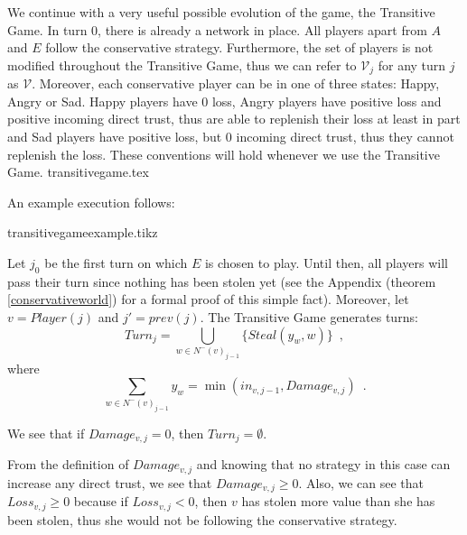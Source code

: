    We continue with a very useful possible evolution of the game, the Transitive Game. In turn 0, there is already a network
   in place. All players apart from $A$ and $E$ follow the conservative strategy. Furthermore, the set of players is not
   modified throughout the Transitive Game, thus we can refer to $\mathcal{V}_j$ for any turn $j$ as $\mathcal{V}$.
   Moreover, each conservative player can be in one of three states: Happy, Angry or Sad. Happy players have 0 loss, Angry
   players have positive loss and positive incoming direct trust, thus are able to replenish their loss at least in part and
   Sad players have positive loss, but 0 incoming direct trust, thus they cannot replenish the loss. These conventions will
   hold whenever we use the Transitive Game.
   {transitivegame.tex}

   An example execution follows:

   {transitivegameexample.tikz}

   Let $j_0$ be the first turn on which $E$ is chosen to play. Until then, all players will pass their turn since nothing
   has been stolen yet (see the Appendix (theorem \ref{conservativeworld}) for a formal proof of this simple fact).
   Moreover, let $v = Player(j)$ and $j' = prev\left(j\right)$.
   The Transitive Game generates turns:
   \begin{equation}
      Turn_j = \bigcup\limits_{w \in N^{-}\left(v\right)_{j-1}}\{Steal\left(y_w,w\right)\} \enspace,
   \end{equation}
   where
   \begin{equation*}
      \sum\limits_{w \in N^{-}\left(v\right)_{j-1}}y_w = \min\left(in_{v, j-1}, Damage_{v, j}\right) \enspace.
   \end{equation*}
 
   We see that if $Damage_{v, j} = 0$, then $Turn_j = \emptyset$.

   From the definition of $Damage_{v,j}$ and knowing that no strategy in this case can increase any direct trust, we see
   that $Damage_{v,j} \geq 0$. Also, we can see that $Loss_{v,j} \geq 0$ because if $Loss_{v,j} < 0$, then $v$ has
   stolen more value than she has been stolen, thus she would not be following the conservative strategy.
